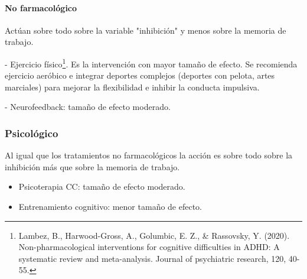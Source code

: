 \paragraph*{No farmacológico}
Actúan sobre todo sobre la variable "inhibición" y menos sobre la memoria de trabajo.

- Ejercicio físico\footnote{Lambez, B., Harwood-Gross, A., Golumbic, E. Z., \& Rassovsky, Y. (2020). Non-pharmacological interventions for cognitive difficulties in ADHD: A systematic review and meta-analysis. Journal of psychiatric research, 120, 40-55.}. Es la intervención con mayor tamaño de efecto. Se recomienda ejercicio aeróbico e integrar deportes complejos (deportes con pelota, artes marciales) para mejorar la flexibilidad e inhibir la conducta impulsiva.

- Neurofeedback: tamaño de efecto moderado.
\subsubsection*{Psicológico}
Al igual que los tratamientos no farmacológicos la acción es sobre todo sobre la inhibición más que sobre la memoria de trabajo.
\begin{itemize}
    \item Psicoterapia CC: tamaño de efecto moderado.
    \item Entrenamiento cognitivo: menor tamaño de efecto.
\end{itemize}
\printbibliography
